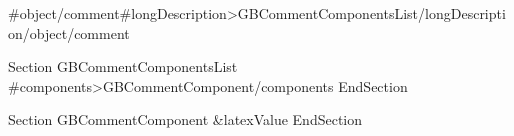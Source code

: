 {{#object/comment}}{{#longDescription}}{{>GBCommentComponentsList}}{{/longDescription}}{{/object/comment}}


Section GBCommentComponentsList
{{#components}}{{>GBCommentComponent}}{{/components}}
EndSection

Section GBCommentComponent
{{&latexValue}}
EndSection
